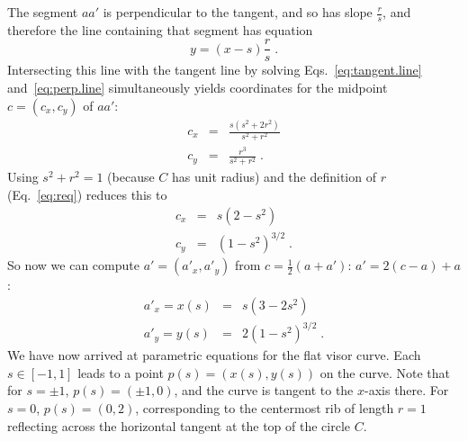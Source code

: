 \pdfoutput=1  \documentclass[]{article}
\newcommand{\eqnlab}[1]{\label{eq:#1}}
\newcommand{\eqnref}[1]{\ref{eq:#1}}
\begin{document}
The segment $a a'$ is perpendicular to the tangent, and so has slope $\frac{r}{s}$,
and therefore the line containing that segment has equation
\begin{equation}
y = (x-s) \frac{r}{s} \; .
\eqnlab{perp.line}
\end{equation}
Intersecting this line with the tangent line by solving
Eqs.~\eqnref{tangent.line} and~\eqnref{perp.line} simultaneously
yields coordinates for the midpoint $c = (c_x,c_y)$ of $a a'$:
\begin{eqnarray*}
c_x & = & \frac{s( s^2 +2 r^2)}{s^2+r^2}  \\
c_y & =  & \frac{r^3}{s^2+r^2}  \; .
\end{eqnarray*}
Using $s^2 + r^2 = 1$ (because $C$ has unit radius)
and the definition of $r$ (Eq.~\eqnref{req}) reduces this to
\begin{eqnarray}
c_x & = &   s (2 -s^2) \nonumber \\
c_y & =  &  (1-s^2)^{3/2} \; .
\eqnlab{midpoint}
\end{eqnarray}
So now we can compute $a'= (a'_x,a'_y)$ from $c= \frac{1}{2}(a + a')$:
$a' = 2(c - a) + a$: 
\begin{eqnarray}
a'_x =x(s) &=& s (3-2 s^2) \nonumber \\
a'_y =y(s) &=& 2(1-s^2)^{3/2} \; .
\eqnlab{aprime}
\end{eqnarray}
We have now arrived at parametric equations for the flat visor curve.
Each $s \in [-1,1]$ leads to a point $p(s)  =  (x(s),y(s))$ on the curve.
Note that for $s=\pm 1$, $p(s) = (\pm1,0)$, and the curve is
tangent to the $x$-axis there.
For $s=0$, $p(s) = (0,2)$,
 corresponding to the centermost rib of length $r=1$ reflecting across the horizontal
tangent at the top of the circle $C$.
\end{document}
